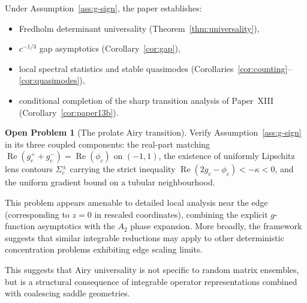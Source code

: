 \documentclass[12pt,a4paper]{amsart}
\theoremstyle{definition}
\newtheorem{problem}[theorem]{Open Problem}
\theoremstyle{remark}
\begin{document}
Under Assumption~\ref{ass:g-sign}, the paper establishes:
\begin{itemize}
\item Fredholm determinant universality (Theorem~\ref{thm:universality}),
\item $c^{-1/3}$ gap asymptotics (Corollary~\ref{cor:gap}),
\item local spectral statistics and stable quasimodes
  (Corollaries~\ref{cor:counting}--\ref{cor:quasimodes}),
\item conditional completion of the sharp transition analysis of Paper~XIII
  (Corollary~\ref{cor:paper13b}).
\end{itemize}

\begin{problem}[The prolate Airy transition]
\label{prob:main}
Verify Assumption~\ref{ass:g-sign} in its three coupled components:
the real-part matching $\operatorname{Re}(g_c^+ + g_c^-) = \operatorname{Re}(\phi_c)$
on $(-1,1)$, the existence of uniformly Lipschitz lens contours
$\Sigma_c^\pm$ carrying the strict inequality
$\operatorname{Re}(2g_c - \phi_c) < -\kappa < 0$,
and the uniform gradient bound on a tubular neighbourhood.
\end{problem}

This problem appears amenable to detailed local analysis near the
edge (corresponding to $z=0$ in rescaled coordinates),
combining the explicit $g$-function asymptotics with the
$A_2$ phase expansion.
More broadly, the framework suggests that similar integrable reductions
may apply to other deterministic concentration problems exhibiting
edge scaling limits.

This suggests that Airy universality is not specific to random matrix
ensembles, but is a structural consequence of integrable operator
representations combined with coalescing saddle geometries.
\end{document}
